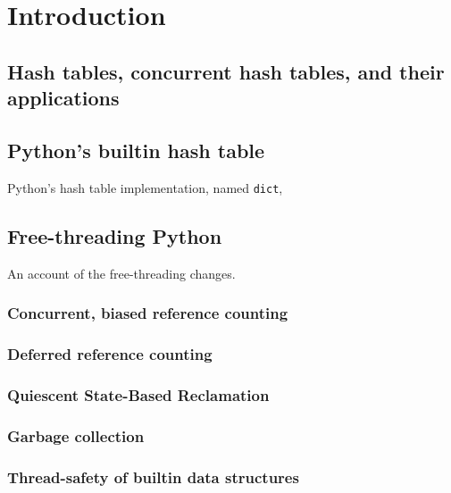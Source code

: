 \chapter{Introduction}

\section{Hash tables, concurrent hash tables, and their applications}

\cite{art-mp}

\section{Python's builtin hash table}

Python's hash table implementation, named \texttt{dict}, 

\cite{hettinger-dict}
\cite{dict-notes}
\cite{dict-comment-design}
\cite{dict-comment-hash}

\section{Free-threading Python}

An account of the free-threading changes.

\cite{dabeaz-gil}
\cite{gross-doc}
\cite{mimalloc}

\subsection{Concurrent, biased reference counting}

\cite{biased-refcounting}

\subsection{Deferred reference counting}

\cite{deferred-refcounting}

\subsection{Quiescent State-Based Reclamation}

\cite{qsbr}

\subsection{Garbage collection}

\cite{pep703}

\subsection{Thread-safety of builtin data structures}

\cite[\S Container Thread-Safety]{pep703}
